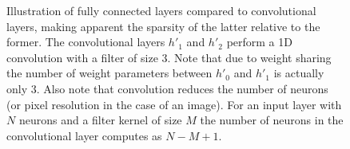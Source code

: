 \begin{figure}
    \centering
{}
\caption[Illustration of convolutional layers]{Illustration of fully connected layers compared to convolutional layers, making apparent the sparsity of the latter relative to the former. The convolutional layers $h'_1$ and $h'_2$ perform a 1D convolution with a filter of size $3$. Note that due to weight sharing the number of weight parameters between $h'_0$ and $h'_1$ is actually only $3$. Also note that convolution reduces the number of neurons (or pixel resolution in the case of an image). For an input layer with $N$ neurons and a filter kernel of size $M$ the number of neurons in the convolutional layer computes as $N-M+1$. }\label{fig:convolutional}
\end{figure}\noindent

